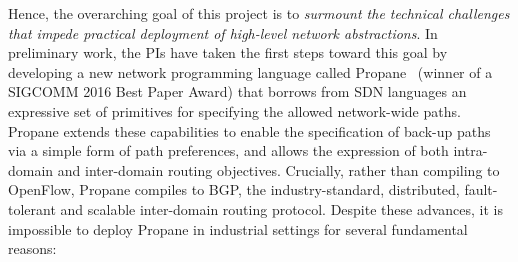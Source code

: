 Hence, the overarching goal of this project is to {\em surmount the technical challenges that impede practical deployment of high-level network abstractions}.  In preliminary work, 
the PIs have taken the first steps toward this goal by developing a
new network programming language called Propane~\cite{beckett+:propane} (winner of a SIGCOMM 2016
Best Paper Award) that borrows from SDN languages an expressive set of primitives for specifying the allowed network-wide paths.  Propane extends these capabilities to enable the specification of back-up paths via a simple form of path preferences, and allows the expression of both intra-domain 
and inter-domain routing objectives.  Crucially, rather than compiling to OpenFlow,
Propane compiles to BGP, the industry-standard, distributed, fault-tolerant and scalable inter-domain routing protocol. 
Despite these advances, it is impossible to deploy Propane in industrial settings for several fundamental reasons:




